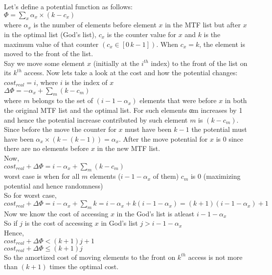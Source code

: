 Let's define a potential function as follows: \\

$\Phi = \sum\limits_{x} \alpha_{x} \times (k - c_{x})$ \\


where $\alpha_{x}$ is the number of elements before element $x$ in the MTF list but after $x$ in the optimal list (God’s list), $c_{x}$ is the counter value for $x$ and $k$ is the maximum value of that counter $(c_{x} \in [0 \, k-1])$. When $c_{x} = k$, the element is moved to the front of the list. \\

Say we move some element $x$ (initially at the $i^{th}$ index) to the front of the list on its $k^{th}$ access. Now lets take a look at the cost and how the potential changes: \\

$cost_{real} = i$, where $i$ is the index of $x$ \\


$\Delta \Phi = - \alpha_{x} + \sum\limits_{m} (k - c_{m})$ \\

where $m$ belongs to the set of $(i - 1 - \alpha_{x})$ elements that were before $x$ in both the original MTF list and the optimal list. For such elements αm increases by 1 and hence the potential increase contributed by such element $m$ is $(k - c_{m})$. Since before the move the counter for $x$ must have been $k - 1$ the potential must have been  $\alpha_{x} \times (k - (k - 1)) = \alpha_{x}$. After the move potential for $x$ is $0$ since there are no elements before $x$ in the new MTF list. \\

Now, \\

$cost_{real} + \Delta \Phi = i - \alpha_{x} + \sum\limits_{m} (k - c_{m})$ \\

worst case is when for all $m$ elements ($i - 1 - \alpha_{x}$ of them) $c_{m}$ is $0$ (maximizing potential and hence randomness) \\

So for worst case, \\

$cost_{real} + \Delta \Phi = i - \alpha_{x} + \sum\limits_{m} k = i - \alpha_{x} + k(i - 1 - \alpha_{x}) = (k+1)(i - 1- \alpha_{x}) + 1$ \\

Now we know the cost of accessing $x$ in the God’s list is atleast $i - 1 - \alpha_{x}$ \\
So if $j$ is the cost of accessing $x$ in God’s list $j > i - 1 - \alpha_{x}$ \\

Hence, \\

$cost_{real} + \Delta \Phi < (k + 1)j + 1$ \\
\indent $cost_{real} + \Delta \Phi \leq (k + 1)j$ \\

So the amortized cost of moving elements to the front on $k^{th}$ access is not more than $(k+1)$ times the optimal cost.

